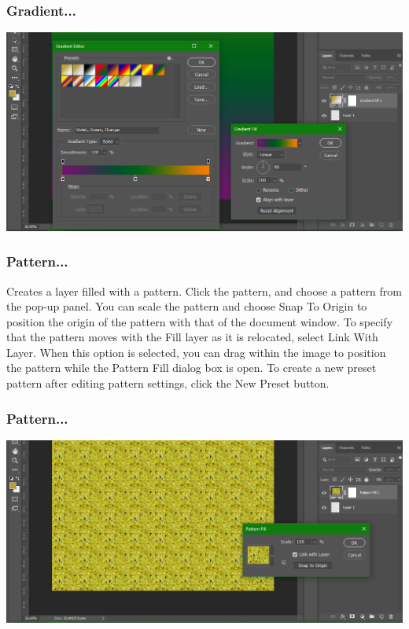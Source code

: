 \documentclass{beamer}
\begin{document}
\begin{frame}
	\frametitle{Gradient...}
	\begin{center}
		\includegraphics[width = 1.0\textwidth]{images/gradient.png}
	\end{center}
\end{frame}

\begin{frame}
	\frametitle{Pattern...}
	\begin{outline}
		\1 Creates a layer filled with a pattern. 
		\2 Click the pattern, and choose a pattern from the pop‑up panel. 
		\2 You can scale the pattern and choose Snap To Origin to position the origin of the pattern with that of the document window. 
		\2 To specify that the pattern moves with the Fill layer as it is relocated, select Link With Layer. 
		\3 When this option is selected, you can drag within the image to position the pattern while the Pattern Fill dialog box is open. 
		\2 To create a new preset pattern after editing pattern settings, click the New Preset button.
	\end{outline}
\end{frame}

\begin{frame}
	\frametitle{Pattern...}
	\begin{center}
		\includegraphics[width = 1.0\textwidth]{images/pattern.png}
	\end{center}
\end{frame}
\end{document}
